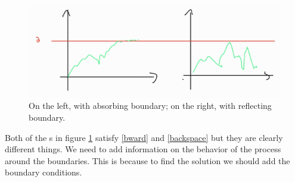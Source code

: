 \documentclass[12pt]{report}
\begin{document}
\begin{figure}[H]
	\centering
	\includegraphics[width=0.7\linewidth]{img/screenshot050}
	\caption{On the left, \bwm{} with absorbing boundary; on the right, with reflecting boundary.}
	\label{fig:screenshot050}
\end{figure}
Both of the \bwm s in figure \ref{fig:screenshot050} satisfy \ref{bward} and \ref{backspace} but they are clearly different things. We need to add information on the behavior of the process around the boundaries. This is because to find the solution we should add the boundary conditions.
\end{document}
